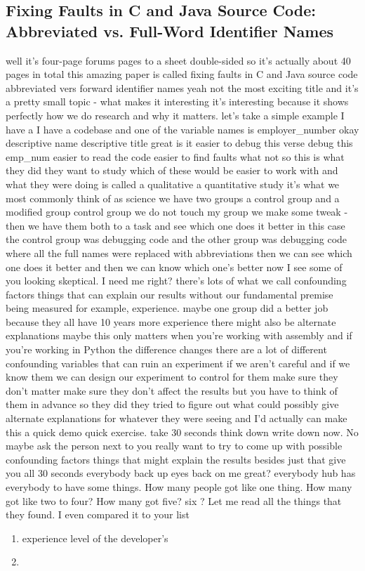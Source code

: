 \documentclass[conference, compsoc, twoside]{IEEEtran}
\begin{document}
\subsection{Fixing Faults in C and Java Source Code: Abbreviated vs. Full-Word Identifier Names}
well it's four-page forums pages to a sheet double-sided so it's actually about 40 pages in total this amazing paper is called fixing faults in C and Java source code
abbreviated vers forward identifier
names yeah not the most exciting title
and it's a pretty small topic - what
makes it interesting it's interesting
because it shows perfectly how we do
research and why it matters.
let's take a simple example I have a I
have a codebase and one of the variable
names is employer\_number okay
descriptive name descriptive title great
is it easier to debug this verse debug
this emp\_num easier to read the code
easier to find faults what not so this
is what they did they want to study
which of these would be easier to work
with and what they were doing is called a qualitative a quantitative study it's
what we most commonly think of as science we have two groups a control
group and a modified group control group
we do not touch my group we make some
tweak - then we have them both to a task
and see which one does it better in this
case the control group was debugging
code and the other group was debugging
code where all the full names were
replaced with abbreviations then we can
see which one does it better and then we
can know which one's better now I see
some of you looking skeptical. I need me
right? there's lots of what we call
confounding factors things that can
explain our results without our
fundamental premise being measured for
example, experience.
 maybe one group did a better job because they all have 10
years more experience there might also
be alternate explanations
maybe this only matters when you're
working with assembly and if you're
working in Python the difference changes
there are a lot of different confounding
variables that can ruin an experiment if
we aren't careful and if we know them we
can design our experiment to control for
them make sure they don't matter
make sure they don't affect the results
but you have to think of them in advance
so they did they tried to figure out
what could possibly give alternate
explanations for whatever they were
seeing and I'd actually can make this a
quick demo quick exercise.
take 30 seconds think down write down now.
No
maybe ask the person next to you really
want to try to come up with possible
confounding factors things that might
explain the results besides just that
give you all 30 seconds everybody back up eyes back on me great?
everybody hub has everybody to have some
things.
How many people got like one thing. 
How many got like two to four? 
How many got five? six ?
Let me read all the things that they found.
I even compared it to your list
\begin{enumerate}
\item experience level of the developer's
\item
\end{enumerate}
\end{document}
